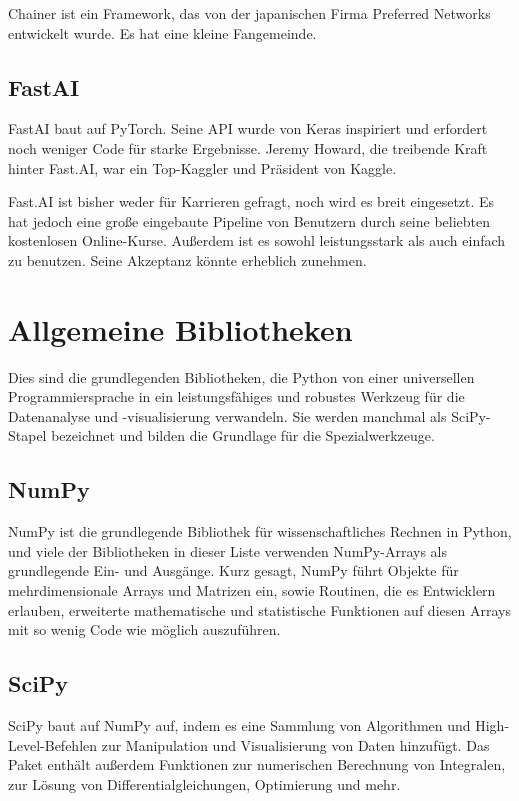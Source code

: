 Chainer ist ein Framework, das von der japanischen Firma Preferred Networks entwickelt wurde. Es hat eine kleine Fangemeinde. \cite{Chainer:2020}

\subsection{FastAI}

FastAI baut auf PyTorch. Seine API wurde von Keras inspiriert und erfordert noch weniger Code für starke Ergebnisse.  Jeremy Howard, die treibende Kraft hinter Fast.AI, war ein Top-Kaggler und Präsident von Kaggle. \cite{FastAI:2020}

Fast.AI ist bisher weder für Karrieren gefragt, noch wird es breit eingesetzt. Es hat jedoch eine große eingebaute Pipeline von Benutzern durch seine beliebten kostenlosen Online-Kurse. Außerdem ist es sowohl leistungsstark als auch einfach zu benutzen. Seine Akzeptanz könnte erheblich zunehmen.

\section{Allgemeine Bibliotheken}

Dies sind die grundlegenden Bibliotheken, die Python von einer universellen Programmiersprache in ein leistungsfähiges und robustes Werkzeug für die Datenanalyse und -visualisierung verwandeln. Sie werden manchmal als SciPy-Stapel bezeichnet und bilden die Grundlage für die Spezialwerkzeuge.


\subsection{NumPy}


NumPy ist die grundlegende Bibliothek für wissenschaftliches Rechnen in Python, und viele der Bibliotheken in dieser Liste verwenden NumPy-Arrays als grundlegende Ein- und Ausgänge. Kurz gesagt, NumPy führt Objekte für mehrdimensionale Arrays und Matrizen ein, sowie Routinen, die es Entwicklern erlauben, erweiterte mathematische und statistische Funktionen auf diesen Arrays mit so wenig Code wie möglich auszuführen. \cite{Python:2020c}


\subsection{SciPy}

SciPy baut auf NumPy auf, indem es eine Sammlung von Algorithmen und High-Level-Befehlen zur Manipulation und Visualisierung von Daten hinzufügt. Das Paket enthält außerdem Funktionen zur numerischen Berechnung von Integralen, zur Lösung von Differentialgleichungen, Optimierung und mehr.

